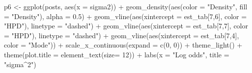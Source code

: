 \documentclass[12pt]{article}
\newenvironment{Shaded}{\begin{snugshade}}{\end{snugshade}}
\newcommand{\AttributeTok}[1]{\textcolor[rgb]{0.77,0.63,0.00}{#1}}
\newcommand{\DecValTok}[1]{\textcolor[rgb]{0.00,0.00,0.81}{#1}}
\newcommand{\FloatTok}[1]{\textcolor[rgb]{0.00,0.00,0.81}{#1}}
\newcommand{\FunctionTok}[1]{\textcolor[rgb]{0.00,0.00,0.00}{#1}}
\newcommand{\NormalTok}[1]{#1}
\newcommand{\OtherTok}[1]{\textcolor[rgb]{0.56,0.35,0.01}{#1}}
\newcommand{\SpecialCharTok}[1]{\textcolor[rgb]{0.00,0.00,0.00}{#1}}
\newcommand{\StringTok}[1]{\textcolor[rgb]{0.31,0.60,0.02}{#1}}
\begin{document}
\begin{Shaded}
\begin{Highlighting}[]
\NormalTok{p6 }\OtherTok{\textless{}{-}} \FunctionTok{ggplot}\NormalTok{(posts, }\FunctionTok{aes}\NormalTok{(}\AttributeTok{x =}\NormalTok{ sigma2)) }\SpecialCharTok{+}
  \FunctionTok{geom\_density}\NormalTok{(}\FunctionTok{aes}\NormalTok{(}\AttributeTok{color =} \StringTok{"Density"}\NormalTok{, }\AttributeTok{fill =} \StringTok{"Density"}\NormalTok{), }\AttributeTok{alpha =} \FloatTok{0.5}\NormalTok{) }\SpecialCharTok{+}
  \FunctionTok{geom\_vline}\NormalTok{(}\FunctionTok{aes}\NormalTok{(}\AttributeTok{xintercept =}\NormalTok{ est\_tab[}\DecValTok{7}\NormalTok{,}\DecValTok{6}\NormalTok{], }\AttributeTok{color =} \StringTok{"HPD"}\NormalTok{), }\AttributeTok{linetype =} \StringTok{"dashed"}\NormalTok{) }\SpecialCharTok{+}
  \FunctionTok{geom\_vline}\NormalTok{(}\FunctionTok{aes}\NormalTok{(}\AttributeTok{xintercept =}\NormalTok{ est\_tab[}\DecValTok{7}\NormalTok{,}\DecValTok{7}\NormalTok{], }\AttributeTok{color =} \StringTok{"HPD"}\NormalTok{), }\AttributeTok{linetype =} \StringTok{"dashed"}\NormalTok{) }\SpecialCharTok{+}
  \FunctionTok{geom\_vline}\NormalTok{(}\FunctionTok{aes}\NormalTok{(}\AttributeTok{xintercept =}\NormalTok{ est\_tab[}\DecValTok{7}\NormalTok{,}\DecValTok{4}\NormalTok{], }\AttributeTok{color =} \StringTok{"Mode"}\NormalTok{)) }\SpecialCharTok{+}
  \FunctionTok{scale\_x\_continuous}\NormalTok{(}\AttributeTok{expand =} \FunctionTok{c}\NormalTok{(}\DecValTok{0}\NormalTok{, }\DecValTok{0}\NormalTok{)) }\SpecialCharTok{+}
  \FunctionTok{theme\_light}\NormalTok{() }\SpecialCharTok{+}
  \FunctionTok{theme}\NormalTok{(}\AttributeTok{plot.title =} \FunctionTok{element\_text}\NormalTok{(}\AttributeTok{size=} \DecValTok{12}\NormalTok{)) }\SpecialCharTok{+} 
  \FunctionTok{labs}\NormalTok{(}\AttributeTok{x =} \StringTok{"Log odds"}\NormalTok{,}
       \AttributeTok{title =} \StringTok{"sigma\^{}2"}\NormalTok{)}


\end{Highlighting}
\end{Shaded}
\end{document}
